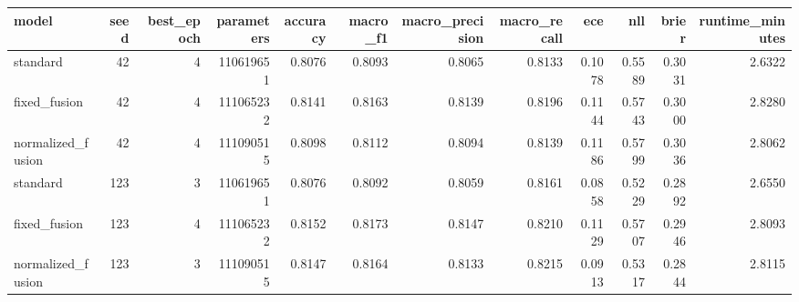 \begin{tabular}{lrrrrrrrrrrr}
\toprule
model & seed & best_epoch & parameters & accuracy & macro_f1 & macro_precision & macro_recall & ece & nll & brier & runtime_minutes \\
\midrule
standard & 42 & 4 & 110619651 & 0.8076 & 0.8093 & 0.8065 & 0.8133 & 0.1078 & 0.5589 & 0.3031 & 2.6322 \\
fixed_fusion & 42 & 4 & 111065232 & 0.8141 & 0.8163 & 0.8139 & 0.8196 & 0.1144 & 0.5743 & 0.3000 & 2.8280 \\
normalized_fusion & 42 & 4 & 111090515 & 0.8098 & 0.8112 & 0.8094 & 0.8139 & 0.1186 & 0.5799 & 0.3036 & 2.8062 \\
standard & 123 & 3 & 110619651 & 0.8076 & 0.8092 & 0.8059 & 0.8161 & 0.0858 & 0.5229 & 0.2892 & 2.6550 \\
fixed_fusion & 123 & 4 & 111065232 & 0.8152 & 0.8173 & 0.8147 & 0.8210 & 0.1129 & 0.5707 & 0.2946 & 2.8093 \\
normalized_fusion & 123 & 3 & 111090515 & 0.8147 & 0.8164 & 0.8133 & 0.8215 & 0.0913 & 0.5317 & 0.2844 & 2.8115 \\
\bottomrule
\end{tabular}
